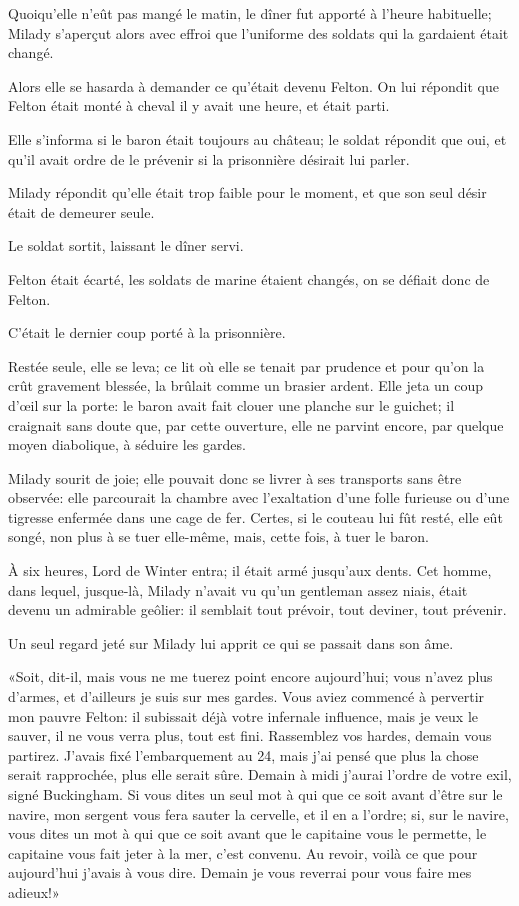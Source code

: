 Quoiqu'elle n'eût pas mangé le matin, le dîner fut apporté à l'heure habituelle; Milady s'aperçut alors avec effroi que l'uniforme des soldats qui la gardaient était changé. 

Alors elle se hasarda à demander ce qu'était devenu Felton. On lui répondit que Felton était monté à cheval il y avait une heure, et était parti. 

Elle s'informa si le baron était toujours au château; le soldat répondit que oui, et qu'il avait ordre de le prévenir si la prisonnière désirait lui parler. 

Milady répondit qu'elle était trop faible pour le moment, et que son seul désir était de demeurer seule. 

Le soldat sortit, laissant le dîner servi. 

Felton était écarté, les soldats de marine étaient changés, on se défiait donc de Felton. 

C'était le dernier coup porté à la prisonnière. 

Restée seule, elle se leva; ce lit où elle se tenait par prudence et pour qu'on la crût gravement blessée, la brûlait comme un brasier ardent. Elle jeta un coup d'œil sur la porte: le baron avait fait clouer une planche sur le guichet; il craignait sans doute que, par cette ouverture, elle ne parvint encore, par quelque moyen diabolique, à séduire les gardes. 

Milady sourit de joie; elle pouvait donc se livrer à ses transports sans être observée: elle parcourait la chambre avec l'exaltation d'une folle furieuse ou d'une tigresse enfermée dans une cage de fer. Certes, si le couteau lui fût resté, elle eût songé, non plus à se tuer elle-même, mais, cette fois, à tuer le baron. 

À six heures, Lord de Winter entra; il était armé jusqu'aux dents. Cet homme, dans lequel, jusque-là, Milady n'avait vu qu'un gentleman assez niais, était devenu un admirable geôlier: il semblait tout prévoir, tout deviner, tout prévenir. 

Un seul regard jeté sur Milady lui apprit ce qui se passait dans son âme. 

«Soit, dit-il, mais vous ne me tuerez point encore aujourd'hui; vous n'avez plus d'armes, et d'ailleurs je suis sur mes gardes. Vous aviez commencé à pervertir mon pauvre Felton: il subissait déjà votre infernale influence, mais je veux le sauver, il ne vous verra plus, tout est fini. Rassemblez vos hardes, demain vous partirez. J'avais fixé l'embarquement au 24, mais j'ai pensé que plus la chose serait rapprochée, plus elle serait sûre. Demain à midi j'aurai l'ordre de votre exil, signé Buckingham. Si vous dites un seul mot à qui que ce soit avant d'être sur le navire, mon sergent vous fera sauter la cervelle, et il en a l'ordre; si, sur le navire, vous dites un mot à qui que ce soit avant que le capitaine vous le permette, le capitaine vous fait jeter à la mer, c'est convenu. Au revoir, voilà ce que pour aujourd'hui j'avais à vous dire. Demain je vous reverrai pour vous faire mes adieux!» 

